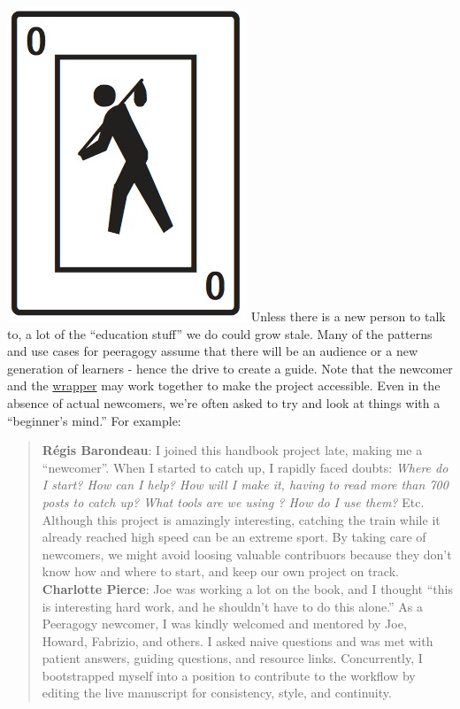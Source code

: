 \includegraphics[width=.3\textwidth]{../pictures/unicode-fool.jpeg}
Unless there is a new person to talk to, a lot of the ``education
stuff'' we do could grow stale. Many of the patterns and use cases for
peeragogy assume that there will be an audience or a new generation of
learners - hence the drive to create a guide. Note that the newcomer and
the \href{http://peeragogy.org/practice/wrapper/}{wrapper} may work
together to make the project accessible. Even in the absence of actual
newcomers, we're often asked to try and look at things with a
``beginner's mind.'' For example:

\begin{quote}
\textbf{Régis Barondeau}: I joined this handbook project late, making me
a ``newcomer''. When I started to catch up, I rapidly faced doubts:
\emph{Where do I start? How can I help? How will I make it, having to
read more than 700 posts to catch up? What tools are we using ? How do I
use them?} Etc. Although this project is amazingly interesting, catching
the train while it already reached high speed can be an extreme sport.
By taking care of newcomers, we might avoid loosing valuable contribuors
because they don't know how and where to start, and keep our own project
on track. \textbf{Charlotte Pierce}: Joe was working a lot on the book,
and I thought ``this is interesting hard work, and he shouldn't have to
do this alone.'' As a Peeragogy newcomer, I was kindly welcomed and
mentored by Joe, Howard, Fabrizio, and others. I asked naive questions
and was met with patient answers, guiding questions, and resource links.
Concurrently, I bootstrapped myself into a position to contribute to the
workflow by editing the live manuscript for consistency, style, and
continuity.
\end{quote}
